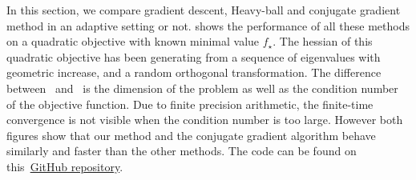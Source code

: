 \documentclass{article}
\begin{document}
    In this section, we compare gradient descent, Heavy-ball and conjugate gradient method in an adaptive setting or not.  shows the performance of all these methods on a quadratic objective with known minimal value $f_\star$.
    The hessian of this quadratic objective has been generating from a sequence of eigenvalues with geometric increase, and a random orthogonal transformation.
    The difference between~ and~ is the dimension of the problem as well as the condition number of the objective function.
    Due to finite precision arithmetic, the finite-time convergence is not visible when the condition number is too large.
    However both figures show that our method and the conjugate gradient algorithm behave similarly and faster than the other methods.
    The code can be found on this~\href{https://github.com/bgoujaud/Heavy-ball_polyak_steps}{GitHub repository}.
\end{document}
